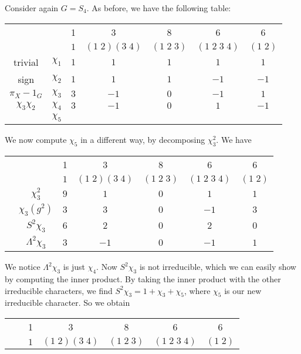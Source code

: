 \documentclass[a4paper]{article}
\begin{document}
\begin{eg}
  Consider again $G = S_4$. As before, we have the following table:
  \begin{center}
    \begin{tabular}{ccccccc}
      \toprule
      & & 1 & 3 & 8 & 6 & 6\\
      & & $1$ & $(1\; 2)(3\; 4)$ & $(1\; 2\; 3)$ & $(1\; 2\; 3\; 4)$ & $(1\; 2)$\\
      \midrule
      trivial & $\chi_1$ & $1$ & $1$ & $1$ & $1$ & $1$\\
      sign & $\chi_2$ & $1$ & $1$ & $1$ & $-1$ & $-1$\\
      $\pi_X - 1_G$ & $\chi_3$ & $3$ & $-1$ & $0$ & $-1$ & $1$\\
      $\chi_3 \chi_2$ & $\chi_4$ & $3$ & $-1$ & $0$ & $1$ & $-1$\\
      & $\chi_5$ &\\
      \bottomrule
    \end{tabular}
  \end{center}
  We now compute $\chi_5$ in a different way, by decomposing $\chi_3^2$. We have
  \begin{center}
    \begin{tabular}{ccccccc}
      \toprule
      & & 1 & 3 & 8 & 6 & 6\\
      & & $1$ & $(1\; 2)(3\; 4)$ & $(1\; 2\; 3)$ & $(1\; 2\; 3\; 4)$ & $(1\; 2)$\\
      \midrule
      & $\chi_3^2$ & $9$ & $1$ & $0$ & $1$ & $1$\\
      & $\chi_3(g^2)$ & $3$ & $3$ & $0$ & $-1$ & $3$\\
      & $S^2 \chi_3$ & $6$ & $2$ & $0$ & $2$ & $0$\\
      & $\Lambda^2 \chi_3$ & $3$ & $-1$ & $0$ & $-1$ & $1$\\
      \bottomrule
    \end{tabular}
  \end{center}
  We notice $\Lambda^2 \chi_3$ is just $\chi_4$. Now $S^2 \chi_3$ is not irreducible, which we can easily show by computing the inner product. By taking the inner product with the other irreducible characters, we find $S^2\chi_3 = 1 + \chi_3 + \chi_5$, where $\chi_5$ is our new irreducible character. So we obtain
  \begin{center}
    \begin{tabular}{ccccccc}
      \toprule
      & & 1 & 3 & 8 & 6 & 6\\
      & & $1$ & $(1\; 2)(3\; 4)$ & $(1\; 2\; 3)$ & $(1\; 2\; 3\; 4)$ & $(1\; 2)$\\

\end{tabular}
\end{center}
\end{eg}
\end{document}
